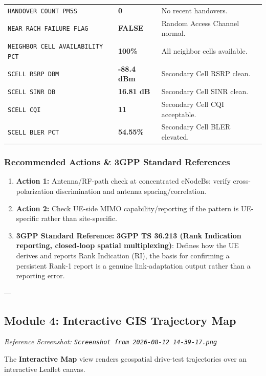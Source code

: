\documentclass[12pt,a4paper]{article}
\begin{document}
\begin{table}[htbp]
\begin{tabular}{lll}
\texttt{HANDOVER COUNT PM5S} & \textbf{0} & No recent handovers. \\
\texttt{NEAR RACH FAILURE FLAG} & \textbf{FALSE} & Random Access Channel normal. \\
\texttt{NEIGHBOR CELL AVAILABILITY PCT} & \textbf{100\%} & All neighbor cells available. \\
\texttt{SCELL RSRP DBM} & \textbf{-88.4 dBm} & Secondary Cell RSRP clean. \\
\texttt{SCELL SINR DB} & \textbf{16.81 dB} & Secondary Cell SINR clean. \\
\texttt{SCELL CQI} & \textbf{11} & Secondary Cell CQI acceptable. \\
\texttt{SCELL BLER PCT} & \textbf{54.55\%} & Secondary Cell BLER elevated. \\
\bottomrule
\end{tabular}
\end{table}

\subsubsection{Recommended Actions \& 3GPP Standard References}
\begin{enumerate}
    \item \textbf{Action 1:} Antenna/RF-path check at concentrated eNodeBs: verify cross-polarization discrimination and antenna spacing/correlation.
    \item \textbf{Action 2:} Check UE-side MIMO capability/reporting if the pattern is UE-specific rather than site-specific.
    \item \textbf{3GPP Standard Reference:} \textbf{3GPP TS 36.213 (Rank Indication reporting, closed-loop spatial multiplexing)}: Defines how the UE derives and reports Rank Indication (RI), the basis for confirming a persistent Rank-1 report is a genuine link-adaptation output rather than a reporting error.
\end{enumerate}

---

\subsection{Module 4: Interactive GIS Trajectory Map}
\textit{Reference Screenshot: \texttt{Screenshot from 2026-08-12 14-39-17.png}}

The \textbf{Interactive Map} view renders geospatial drive-test trajectories over an interactive Leaflet canvas.
\end{document}
